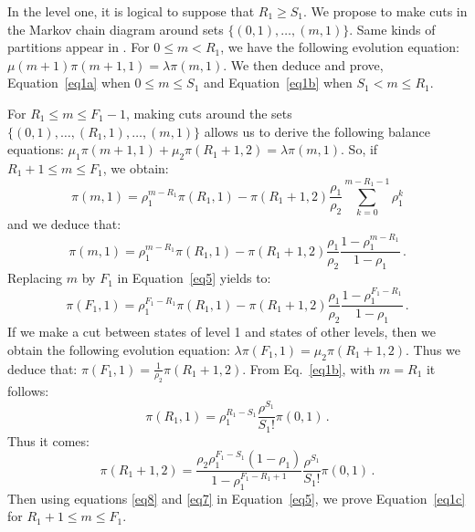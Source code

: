 \documentclass[conference]{IEEEtran}
\begin{document}
\begin{IEEEproof}
In the level one, it is logical to suppose that $R_1 \geq S_1$.
We propose to make cuts  in the Markov chain diagram around sets
$\{(0,1), \ldots, (m,1)\}$. Same kinds of partitions appear in \cite{mitrani2013managing}.  
For $0 \leq m < R_1$, we have the following evolution equation: $\mu(m+1) \pi(m+1,1)= \lambda \pi(m,1)$. 
We then deduce and prove, Equation~\eqref{eq1a} when $0 \leq m \leq S_1$ and 
Equation~\eqref{eq1b} when $S_1<  m \leq R_1$. 

For $R_1 \leq m \leq   F_1-1$, making cuts around the sets $\{(0,1), \ldots,(R_1,1), \ldots, (m,1)\}$ allows us to derive  
the following balance equations: $\mu_1 \pi(m+1,1) + \mu_2 \pi(R_1+1,2)  = \lambda \pi(m,1)$. So, if $R_1+1 \leq m \leq   F_1$, we obtain:
\begin{equation}
\pi(m,1)=\rho_1^{m-R_1} \pi(R_1,1)-\pi(R_1+1,2)\frac{\rho_1}{\rho_2}\sum_{k=0}^{m-R_1-1} \rho_1^k \label{eq4}
\end{equation} 
and we deduce that:
\begin{equation}
\pi(m,1)=\rho_1^{m-R_1} \pi(R_1,1)-\pi(R_1+1,2)\frac{\rho_1}{\rho_2}\frac{1-\rho_1^{m-R_1}}{1-\rho_1} \, . 
\label{eq5}
\end{equation} 
Replacing $m$ by $F_1$ in Equation~\eqref{eq5} yields to:
\begin{equation}
\pi(F_1,1)=\rho_1^{F_1-R_1} \pi(R_1,1)-\pi(R_1+1,2)\frac{\rho_1}{\rho_2}\frac{1-\rho_1^{F_1-R_1}}{1-\rho_1} \, .
\label{eq6}
\end{equation}
If we make a cut between states of level 1 and states of other levels, then we obtain the following evolution equation: 
$\lambda \pi(F_1,1) = \mu_2 \pi(R_1+1,2)$. Thus  we deduce that:
$\pi(F_1,1)=\frac{1}{\rho_2} \pi(R_1+1,2)$. From Eq.~\eqref{eq1b}, with $m=R_1$ it follows:
\begin{equation} 
\pi(R_1,1)=\rho_1^{R_1-S_1} \frac{\rho^{S_1}}{S_1!}\pi(0,1) \, .
\label{eq8}
\end{equation} 
Thus it comes:
\begin{equation}
\pi(R_1+1,2)= \frac{\rho_2 \rho_1^{F_1-S_1} (1-\rho_1)} {1-\rho_1^{F_1-R_1+1}}  \frac{\rho^{S_1}}{S_1!}\pi(0,1) \, .
\label{eq7}
\end{equation} 
Then using equations \eqref{eq8} and \eqref{eq7} in Equation~\eqref{eq5}, we prove Equation~\eqref{eq1c} 
for $R_1+1 \leq m \leq  F_1$.
\end{IEEEproof}
\end{document}
